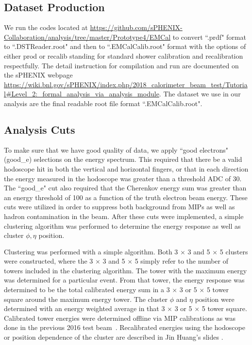 \documentclass[hidelinks,11pt]{article}
\numberwithin{figure}{section}
\numberwithin{table}{section}
\begin{document}
\subsection{Dataset Production}

We run the codes located at \url{https://github.com/sPHENIX-Collaboration/analysis/tree/master/Prototype4/EMCal} to convert ``.prdf" format to ``.DSTReader.root" and then to ``.EMCalCalib.root" format with the options of either prod or recalib standing for standard shower calibration and recalibration respectfully. The detail instruction for compilation and run are documented on the sPHENIX webpage \url{https://wiki.bnl.gov/sPHENIX/index.php/2018_calorimeter_beam_test/Tutorial#Level_2:_formal_analysis_via_analysis_module}. The dataset we use in our analysis are the final readable root file format ``.EMCalCalib.root".


\subsection{Analysis Cuts }

To make sure that we have good quality of data, we apply ``good electrons" (good\_e) selections on the energy spectrum. This required that there be a valid hodoscope hit in both the vertical and horizontal fingers, or that in each direction the energy measured in the hodoscope was greater than a threshold ADC of 30. The ``good\_e" cut also required that the Cherenkov energy sum was greater than an energy threshold of 100 as a function of the truth electron beam energy. These cuts were utilized in order to suppress both background from MIPs as well as hadron contamination in the beam. After these cuts were implemented, a simple clustering algorithm was performed to determine the energy response as well as cluster $\phi,\eta$ position.


\noindent Clustering was performed with a simple algorithm. Both 3 $\times$ 3 and 5 $\times$ 5 clusters were constructed, where the 3 $\times$ 3 and 5 $\times$ 5 simply refer to the number of towers included in the clustering algorithm. The tower with the maximum energy was determined for a particular event. From that tower, the energy response was determined to be the total calibrated energy sum in a 3 $\times$ 3 or 5 $\times$ 5 tower square around the maximum energy tower. The cluster $\phi$ and $\eta$ position were determined with an energy weighted average in that 3 $\times$ 3 or 5 $\times$ 5 tower square. Calibrated tower energies were determined offline via MIP calibrations as was done in the previous 2016 test beam~\cite{OsbornNotes}. Recalibrated energies using the hodoscope or position dependence of the cluster are described in Jin Huang's slides \cite{Calib}. 
\end{document}
